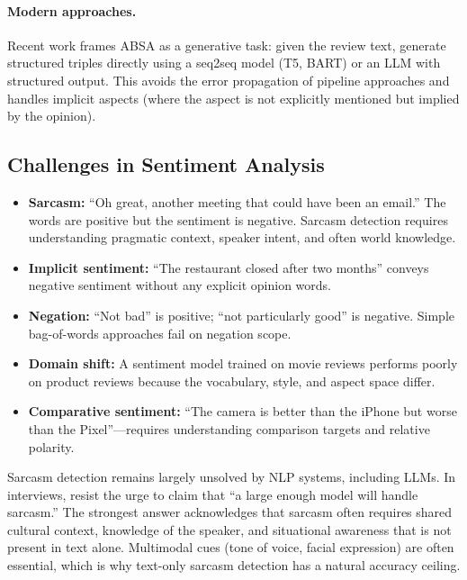 \paragraph{Modern approaches.}
Recent work frames ABSA as a generative task: given the review text, generate structured
triples directly using a seq2seq model (T5, BART) or an LLM with structured output.  This
avoids the error propagation of pipeline approaches and handles implicit aspects (where the
aspect is not explicitly mentioned but implied by the opinion).

\subsection{Challenges in Sentiment Analysis}

\begin{itemize}
    \item \textbf{Sarcasm:} ``Oh great, another meeting that could have been an email.''
          The words are positive but the sentiment is negative.  Sarcasm detection requires
          understanding pragmatic context, speaker intent, and often world knowledge.
    \item \textbf{Implicit sentiment:} ``The restaurant closed after two months'' conveys
          negative sentiment without any explicit opinion words.
    \item \textbf{Negation:} ``Not bad'' is positive; ``not particularly good'' is negative.
          Simple bag-of-words approaches fail on negation scope.
    \item \textbf{Domain shift:} A sentiment model trained on movie reviews performs poorly on
          product reviews because the vocabulary, style, and aspect space differ.
    \item \textbf{Comparative sentiment:} ``The camera is better than the iPhone but worse
          than the Pixel''---requires understanding comparison targets and relative polarity.
\end{itemize}

\begin{warningbox}
Sarcasm detection remains largely unsolved by NLP systems, including LLMs.  In interviews,
resist the urge to claim that ``a large enough model will handle sarcasm.''  The strongest
answer acknowledges that sarcasm often requires shared cultural context, knowledge of the
speaker, and situational awareness that is not present in text alone.  Multimodal cues
(tone of voice, facial expression) are often essential, which is why text-only sarcasm
detection has a natural accuracy ceiling.
\end{warningbox}

